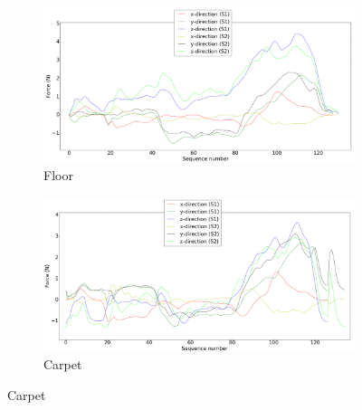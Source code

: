 \documentclass[USenglish]{ifimaster}  %
\begin{document}
\begin{figure} [h]
	\centering
	\begin{subfigure}[b]{\textwidth}
			\includegraphics[width=\textwidth,height=\textheight,keepaspectratio]{Figures/s1gulv2}
			\caption{Floor}
			\label{fig:s1gulv2} 
		\end{subfigure}
		
		\begin{subfigure}[b]{\textwidth}
			\includegraphics[width=\textwidth,height=\textheight,keepaspectratio]{Figures/s1teppe}
			\caption{Carpet}
			\label{fig:s1teppe}
		\end{subfigure}
				\end{figure}
\end{document}
